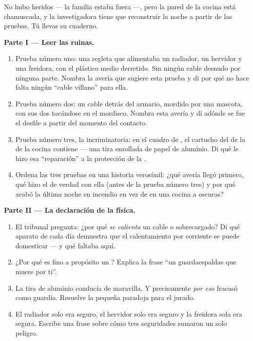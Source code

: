 \begin{problem}\label{pb:g7:short-circuits-safety:1}
No hubo heridos --- la familia estaba fuera ---, pero la pared de la
cocina está chamuscada, y la investigadora tiene que reconstruir la
noche a partir de las pruebas. Tú llevas su cuaderno.

\medskip\noindent\textbf{Parte I --- Leer las ruinas.}
\begin{enumerate}
  \item Prueba número uno: una regleta que alimentaba un radiador, un
        hervidor y una freidora, con el plástico medio derretido. Sin
        ningún cable desnudo por ninguna parte. Nombra la avería que
        sugiere esta prueba y di por qué no hace falta ningún ``cable
        villano'' para ella.
  \item Prueba número dos: un cable detrás del armario, mordido por
        una mascota, con sus dos  tocándose en el
        mordisco. Nombra esta avería y di adónde se fue el desfile a
        partir del momento del contacto.
  \item Prueba número tres, la incriminatoria: en el cuadro de
        , el cartucho del  de la  de la
        cocina contiene --- una tira enrollada de papel de aluminio.
        Di qué le hizo esa ``reparación'' a la protección de la
        .
  \item Ordena las tres pruebas en una historia verosímil: ¿qué
        avería llegó primero, qué hizo el  de verdad con
        ella (antes de la prueba número tres) y por qué acabó la
        última noche en incendio en vez de en una cocina a oscuras?
\end{enumerate}

\medskip\noindent\textbf{Parte II --- La declaración de la física.}
\begin{enumerate}[resume]
  \item El tribunal pregunta: ¿por qué \emph{se calienta} un cable
         o sobrecargado? Di qué aparato de cada día
        demuestra que el calentamiento por corriente se puede
        domesticar --- y qué faltaba aquí.
  \item ¿Por qué es fino a propósito un ? Explica la frase
        ``un guardaespaldas que muere por ti''.
  \item La tira de aluminio conducía de maravilla. Y precisamente
        \emph{por eso} fracasó como guardia. Resuelve la pequeña
        paradoja para el jurado.
  \item El radiador solo era seguro, el hervidor solo era seguro y la
        freidora sola era segura. Escribe una frase sobre cómo tres
        seguridades sumaron un solo peligro.
\end{enumerate}


\end{problem}
